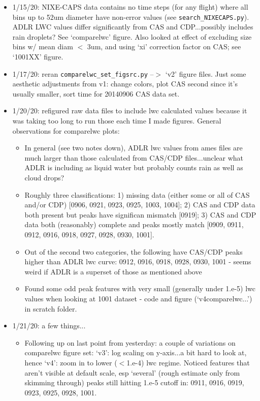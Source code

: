 \documentclass{article}
\begin{document}
\begin{itemize}
	\item 1/15/20: NIXE-CAPS data contains no time steps (for any flight) where all bins up to 52um diameter have non-error values (see \texttt{search\_NIXECAPS.py}). ADLR LWC values differ significantly from CAS and CDP...possibly includes rain droplets? See `comparelwc' figure. Also looked at effect of excluding size bins w/ mean diam $<$ 3um, and using `xi' correction factor on CAS; see `1001XX' figure.
	\item 1/17/20: reran \texttt{comparelwc\_set\_figsrc.py} --$>$ `v2' figure files. Just some aesthetic adjustments from v1: change colors, plot CAS second since it's usually smaller, sort time for 20140906 CAS data set. 
	\item 1/20/20: refigured raw data files to include lwc calculated values because it was taking too long to run those each time I made figures. General observations for comparelwc plots: 
		\begin{itemize}
			\item In general (see two notes down), ADLR lwc values from ames files are much larger than those calculated from CAS/CDP files...unclear what ADLR is including as liquid water but probably counts rain as well as cloud drops?
			\item Roughly three classifications: 1) missing data (either some or all of CAS and/or CDP) [0906, 0921, 0923, 0925, 1003, 1004]; 2) CAS and CDP data both present but peaks have significan mismatch [0919]; 3) CAS and CDP data both (reasonably) complete and peaks mostly match [0909, 0911, 0912, 0916, 0918, 0927, 0928, 0930, 1001]. 
			\item Out of the second two categories, the following have CAS/CDP peaks higher than ADLR lwc curve: 0912, 0916, 0918, 0928, 0930, 1001 - seems weird if ADLR is a superset of those as mentioned above
			\item Found some odd peak features with very small (generally under 1.e-5) lwc values when looking at 1001 dataset - code and figure (`v4comparelwc...') in scratch folder. 
		\end{itemize}
	\item 1/21/20: a few things...
		\begin{itemize}
			\item Following up on last point from yesterday: a couple of variations on comparelwc figure set: `v3': log scaling on y-axis...a bit hard to look at, hence `v4': zoom in to lower ($<$1.e-4) lwc regime. Noticed features that aren't visible at default scale, esp `several' (rough estimate only from skimming through) peaks still hitting 1.e-5 cutoff in: 0911, 0916, 0919, 0923, 0925, 0928, 1001. 

\end{itemize}
\end{itemize}
\end{document}
